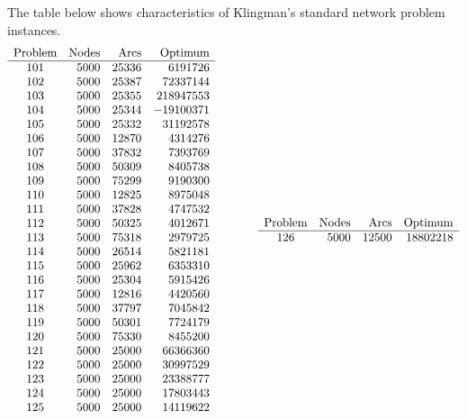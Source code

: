 \documentclass[11pt]{report}
\begin{document}
The table below shows characteristics of Klingman's standard network
problem instances.
$$
\begin{array}{crrr}
{\rm Problem} & {\rm Nodes} & {\rm Arcs} & {\rm Optimum} \\
\hline
101     & 5000  & 25336 &     6191726 \\
102     & 5000  & 25387 &    72337144 \\
103     & 5000  & 25355 &   218947553 \\
104     & 5000  & 25344 &   -19100371 \\
105     & 5000  & 25332 &    31192578 \\
106     & 5000  & 12870 &     4314276 \\
107     & 5000  & 37832 &     7393769 \\
108     & 5000  & 50309 &     8405738 \\
109     & 5000  & 75299 &     9190300 \\
110     & 5000  & 12825 &     8975048 \\
111     & 5000  & 37828 &     4747532 \\
112     & 5000  & 50325 &     4012671 \\
113     & 5000  & 75318 &     2979725 \\
114     & 5000  & 26514 &     5821181 \\
115     & 5000  & 25962 &     6353310 \\
116     & 5000  & 25304 &     5915426 \\
117     & 5000  & 12816 &     4420560 \\
118     & 5000  & 37797 &     7045842 \\
119     & 5000  & 50301 &     7724179 \\
120     & 5000  & 75330 &     8455200 \\
121     & 5000  & 25000 &    66366360 \\
122     & 5000  & 25000 &    30997529 \\
123     & 5000  & 25000 &    23388777 \\
124     & 5000  & 25000 &    17803443 \\
125     & 5000  & 25000 &    14119622 \\
\end{array}
\hspace{.5in}
\begin{array}{crrr}
{\rm Problem} & {\rm Nodes} & {\rm Arcs} & {\rm Optimum} \\
\hline
126     & 5000  & 12500 &    18802218 \\

\end{array}$$
\end{document}
